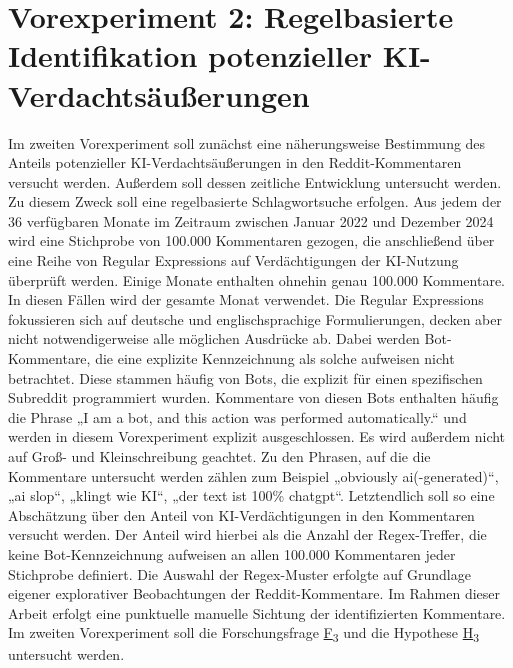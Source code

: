 \section{Vorexperiment 2: Regelbasierte Identifikation potenzieller KI-Verdachtsäußerungen}
\label{subsec:Vorexperiment 2}
Im zweiten Vorexperiment soll zunächst eine näherungsweise Bestimmung des Anteils potenzieller KI-Verdachtsäußerungen in den Reddit-Kommentaren versucht werden. Außerdem soll dessen zeitliche Entwicklung untersucht werden. Zu diesem Zweck soll eine regelbasierte Schlagwortsuche erfolgen. Aus jedem der 36 verfügbaren Monate im Zeitraum zwischen Januar 2022 und Dezember 2024  wird eine Stichprobe von 100.000 Kommentaren gezogen, die anschließend über eine Reihe von Regular Expressions auf Verdächtigungen der KI-Nutzung überprüft werden. Einige Monate enthalten ohnehin genau 100.000 Kommentare. In diesen Fällen wird der gesamte Monat verwendet. Die Regular Expressions fokussieren sich auf deutsche und englischsprachige Formulierungen, decken aber nicht notwendigerweise alle möglichen Ausdrücke ab. Dabei werden Bot-Kommentare, die eine explizite Kennzeichnung als solche aufweisen nicht betrachtet. Diese stammen häufig von Bots, die explizit für einen spezifischen Subreddit programmiert wurden. Kommentare von diesen Bots enthalten häufig die Phrase „I am a bot, and this action was performed automatically.“ und werden in diesem Vorexperiment explizit ausgeschlossen. Es wird außerdem nicht auf Groß- und Kleinschreibung geachtet. Zu den Phrasen, auf die die Kommentare untersucht werden zählen zum Beispiel „obviously ai(-generated)“, „ai slop“, „klingt wie KI“, „der text ist 100\% chatgpt“. Letztendlich soll so eine Abschätzung über den Anteil von KI-Verdächtigungen in den Kommentaren versucht werden. Der Anteil wird hierbei als die Anzahl der Regex-Treffer, die keine Bot-Kennzeichnung aufweisen an allen 100.000 Kommentaren jeder Stichprobe definiert. Die Auswahl der Regex-Muster erfolgte auf Grundlage eigener explorativer Beobachtungen der Reddit-Kommentare. Im Rahmen dieser Arbeit erfolgt eine punktuelle manuelle Sichtung der identifizierten Kommentare. Im zweiten Vorexperiment soll die Forschungsfrage \hyperlink{rq:3}{F\textsubscript{3}} und die Hypothese \hyperlink{hp:3}{H\textsubscript{3}} untersucht werden.

